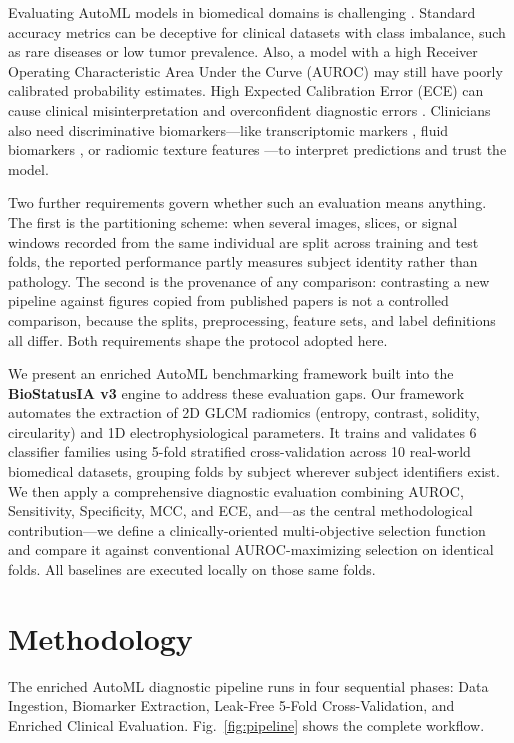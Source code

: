 \documentclass[conference]{IEEEtran}
\begin{document}
Evaluating AutoML models in biomedical domains is challenging \cite{santos2023multi, singh2024metric}. Standard accuracy metrics can be deceptive for clinical datasets with class imbalance, such as rare diseases or low tumor prevalence. Also, a model with a high Receiver Operating Characteristic Area Under the Curve (AUROC) may still have poorly calibrated probability estimates. High Expected Calibration Error (ECE) can cause clinical misinterpretation and overconfident diagnostic errors \cite{guo2017calibration, vancalster2019calibration}. Clinicians also need discriminative biomarkers---like transcriptomic markers \cite{kim2024integrating}, fluid biomarkers \cite{xu2024llm}, or radiomic texture features \cite{baker2022radiomics, martinez2023predicting}---to interpret predictions and trust the model.

Two further requirements govern whether such an evaluation means anything. The first is the partitioning scheme: when several images, slices, or signal windows recorded from the same individual are split across training and test folds, the reported performance partly measures subject identity rather than pathology. The second is the provenance of any comparison: contrasting a new pipeline against figures copied from published papers is not a controlled comparison, because the splits, preprocessing, feature sets, and label definitions all differ. Both requirements shape the protocol adopted here.

We present an enriched AutoML benchmarking framework built into the \textbf{BioStatusIA v3} engine to address these evaluation gaps. Our framework automates the extraction of 2D GLCM radiomics (entropy, contrast, solidity, circularity) and 1D electrophysiological parameters. It trains and validates 6 classifier families using 5-fold stratified cross-validation across 10 real-world biomedical datasets, grouping folds by subject wherever subject identifiers exist. We then apply a comprehensive diagnostic evaluation combining AUROC, Sensitivity, Specificity, MCC, and ECE, and---as the central methodological contribution---we define a clinically-oriented multi-objective selection function and compare it against conventional AUROC-maximizing selection on identical folds. All baselines are executed locally on those same folds.

\section{Methodology}
The enriched AutoML diagnostic pipeline runs in four sequential phases: Data Ingestion, Biomarker Extraction, Leak-Free 5-Fold Cross-Validation, and Enriched Clinical Evaluation. Fig.~\ref{fig:pipeline} shows the complete workflow.
\end{document}
